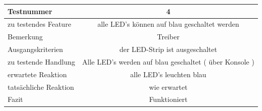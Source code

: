 \documentclass[]{article}
\begin{document}
\begin{longtable}[]{@{}lc@{}}
\toprule
\begin{minipage}[b]{0.25\columnwidth}\raggedright\strut
Testnummer\strut
\end{minipage} & \begin{minipage}[b]{0.55\columnwidth}\centering\strut
4\strut
\end{minipage}\tabularnewline
\midrule
\endhead
\begin{minipage}[t]{0.25\columnwidth}\raggedright\strut
zu testendes Feature\strut
\end{minipage} & \begin{minipage}[t]{0.55\columnwidth}\centering\strut
alle LED's können auf blau geschaltet werden\strut
\end{minipage}\tabularnewline
\begin{minipage}[t]{0.25\columnwidth}\raggedright\strut
Bemerkung\strut
\end{minipage} & \begin{minipage}[t]{0.55\columnwidth}\centering\strut
Treiber\strut
\end{minipage}\tabularnewline
\begin{minipage}[t]{0.25\columnwidth}\raggedright\strut
Ausgangskriterien\strut
\end{minipage} & \begin{minipage}[t]{0.55\columnwidth}\centering\strut
der LED-Strip ist ausgeschaltet\strut
\end{minipage}\tabularnewline
\begin{minipage}[t]{0.25\columnwidth}\raggedright\strut
zu testende Handlung\strut
\end{minipage} & \begin{minipage}[t]{0.55\columnwidth}\centering\strut
Alle LED's werden auf blau geschaltet ( über Konsole )\strut
\end{minipage}\tabularnewline
\begin{minipage}[t]{0.25\columnwidth}\raggedright\strut
erwartete Reaktion\strut
\end{minipage} & \begin{minipage}[t]{0.55\columnwidth}\centering\strut
alle LED's leuchten blau\strut
\end{minipage}\tabularnewline
\begin{minipage}[t]{0.25\columnwidth}\raggedright\strut
tatsächliche Reaktion\strut
\end{minipage} & \begin{minipage}[t]{0.55\columnwidth}\centering\strut
wie erwartet\strut
\end{minipage}\tabularnewline
\begin{minipage}[t]{0.25\columnwidth}\raggedright\strut
Fazit\strut
\end{minipage} & \begin{minipage}[t]{0.55\columnwidth}\centering\strut
Funktioniert\strut
\end{minipage}\tabularnewline
\bottomrule
\end{longtable}
\end{document}

